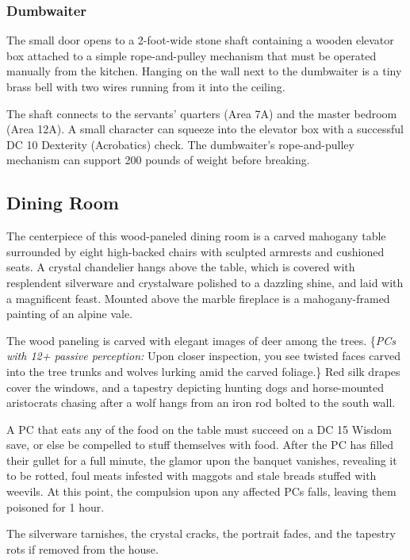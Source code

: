 \subsubsection*{Dumbwaiter}
\begin{readout}
  The small door opens to a 2-foot-wide stone shaft containing a wooden elevator box attached to a simple
  rope-and-pulley mechanism that must be operated manually from the kitchen. Hanging on the wall next to the
  dumbwaiter is a tiny brass bell with two wires running from it into the ceiling.
\end{readout}
The shaft connects to the servants' quarters (Area 7A) and the master bedroom (Area 12A). A small character can
squeeze into the elevator box with a successful DC 10 Dexterity (Acrobatics) check. The dumbwaiter's
rope-and-pulley mechanism can support 200 pounds of weight before breaking.

\begin{arealinks}
\end{arealinks}


\pagebreak
\subsection{Dining Room}
\label{sec:DiningRoom}
\begin{readout}
  The centerpiece of this wood-paneled dining room is a carved mahogany table surrounded by eight high-backed
  chairs with sculpted armrests and cushioned seats. A crystal chandelier hangs above the table, which is
  covered with resplendent silverware and crystalware polished to a dazzling shine, and laid with a magnificent
  feast. Mounted above the marble fireplace is a mahogany-framed painting of an alpine vale.
  
  The wood paneling is carved with elegant images of deer among the trees. \{\textit{PCs with 12+ passive
  perception:} Upon closer inspection, you see twisted faces carved into the tree trunks and wolves lurking 
  amid the carved foliage.\} Red silk drapes cover the windows, and a tapestry depicting hunting dogs and
  horse-mounted aristocrats chasing after a wolf hangs from an iron rod bolted to the south wall.
\end{readout}
A PC that eats any of the food on the table must succeed on a DC 15 Wisdom save, or else be compelled to stuff
themselves with food. After the PC has filled their gullet for a full minute, the glamor upon the banquet
vanishes, revealing it to be rotted, foul meats infested with maggots and stale breads stuffed with weevils.
At this point, the compulsion upon any affected PCs falls, leaving them poisoned for 1 hour.

The silverware tarnishes, the crystal cracks, the portrait fades, and the tapestry rots if removed from the
house.

\begin{arealinks}
\end{arealinks}

